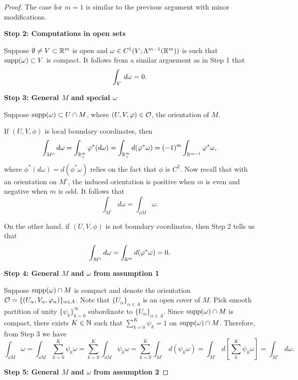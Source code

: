 \documentclass[a4paper]{article}
\renewcommand{\seqinfk}[1]{\{ #1 \}_{k=0}^\infty}
\renewcommand{\sumk}{\sum_{k=0}}
\begin{document}
\begin{proof}
The case for $m = 1$ is similar to the previous argument
with minor modifications.

\textbf{Step 2: Computations in open sets}

Suppose $\emptyset \neq V \subset \mathbb{R}^m$ is open and
$\omega \in C^1 (V; \Lambda^{m-1} (\mathbb{R}^m))$ is such that
$\operatorname{supp}(\omega) \subset V$ is compact. It follows
from a similar arguement as in Step 1 that
\[
\int_V \, d \omega = 0.
\]

\textbf{Step 3: General $M$ and special $\omega$}

Suppose $\operatorname{supp}(\omega) \subset U \cap M$, where
$(U, V, \varphi) \in \mathcal{O}$, the orientation of $M$.

If $(U, V, \phi)$ is local boundary coordinates, then
\[
\int_{M^\circ} d \omega
= \int_{\mathbb{R}^m_+} \varphi^* (d \omega)
= \int_{\mathbb{R}^m_+} d (\varphi^* \omega)
= (-1)^m \int_{\mathbb{R}^{m-1}} \varphi^* \omega,
\]
where $\phi^* (d \omega) = d (\phi^* \omega)$ relies
on the fact that $\phi$ is $C^2$. Now recall that
with an orientation on $M^\circ$, the induced orientation
is positive when $m$ is even and negative when $m$ is odd.
It follows that
\[
\int_{M^\circ} d \omega = \int_{\dd M} \omega.
\]

On the other hand, if $(U, V, \phi)$ is not boundary
coordinates, then Step 2 tells us that
\[
\int_{M^\circ} d \omega = \int_{\mathbb{R}^m} d (\varphi^* \omega) = 0.
\]

\textbf{Step 4: General $M$ and $\omega$ from assumption 1}

Suppose $\operatorname{supp}(\omega) \cap M$ is compact and denote the
orientation
$\mathcal{O} = \{(U_\alpha, V_\alpha, \varphi_\alpha)\}_{\alpha \in A}$.
Note that $\{U_\alpha\}_{\alpha \in A}$ is an open cover of
$M$. Pick smooth partition of unity $\seqinfk{\psi_k}$
subordinate to $\{U_\alpha\}_{\alpha \in A}$. Since
$\operatorname{supp}(\omega) \cap M$ is compact, there exists $K \in \mathbb{N}$
such that $\sumk^K \psi_k = 1$ on $\operatorname{supp}(\omega) \cap M$.
Therefore, from Step 3 we have
\[
\int_{\dd M} \omega
= \int_{\dd M} \sumk^K \psi_k \omega
= \sumk^K \int_{\dd M} \psi_k \omega
= \sumk^K \int_{M^\circ} d (\psi_k \omega)
= \int_{M^\circ} d \left[ \sum_k^K \psi_k \omega \right]
= \int_{M^\circ} d \omega.
\]

\textbf{Step 5: General $M$ and $\omega$ from assumption 2}


\end{proof}
\end{document}
